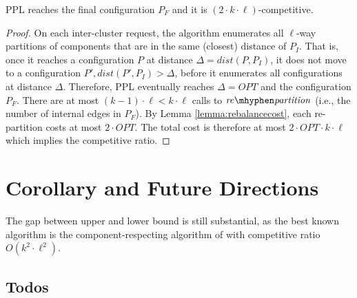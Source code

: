 \documentclass[manuscript,screen=true]{acmart}
\newcommand{\OPT}{\mathit{OPT}}
\newcommand\mahmoud[1]{\color{green}\textbf{\\ Mahmoud: #1}\\\color{black}}
\newcommand{\todo}[1]{\noindent\color{brown}{todo: #1}\color{black}}
\begin{document}
\begin{theorem}	\label{thm:upperbound}
    PPL reaches the final configuration $P_F$ and it is $(2\cdot k\cdot\ell)$-competitive.
\end{theorem}
\begin{proof}
      On each inter-cluster request,
     the algorithm enumerates all $\ell$-way partitions of components
     that are in the same (closest) distance of $P_I$.
     That is, 
     once it reaches a configuration $P$ at distance $\Delta = \mathit{dist} (P, P_I)$,
     it does not move to a configuration
     $P', \mathit{dist} (P', P_I) > \Delta$,
     before it enumerates all configurations at distance $\Delta$.
     Therefore,
     PPL eventually reaches $\Delta=\OPT$ and the configuration $P_F$.
    There are at most $(k-1)\cdot\ell < k\cdot\ell $ calls   to $\mathit{re\mhyphen partition}$
     (i.e., the number of internal edges in $P_F$).
    By Lemma \ref{lemma:rebalancecost},
    each re-partition costs at most $2\cdot\OPT$.
    The total cost is therefore at most $2\cdot\OPT\cdot k\cdot\ell$ which implies the competitive ratio.
 \end{proof}


\section{Corollary and Future Directions}

The gap between upper and lower bound is still substantial, as the best known algorithm is the component-respecting algorithm of   \cite{repartition-disc} with competitive ratio $O(k^2\cdot\ell^2)$.



  

\begin{appendix}

\section{Todos}

\todo{ACM format for review? Is there any specific format like this? With line numbers etc.}

\todo{Include e-mails? Or shall we skip it for now.}

\todo{Check ACM package whitelist}

\todo{Replace package algorithmpseudocode, it is not whitelisted https://www.acm.org/publications/taps/whitelist-of-latex-packages}

\todo{Make an ACM account for the submission}

\todo{ACM keywords are mandatory}

\todo{CCS concepts are mandatory}

\todo{Check grammar}

\todo{Make sure our manuscript is autor anonymous}

\todo{Font for OPT, ALG, DET, dist etc}

\end{appendix}
\end{document}
